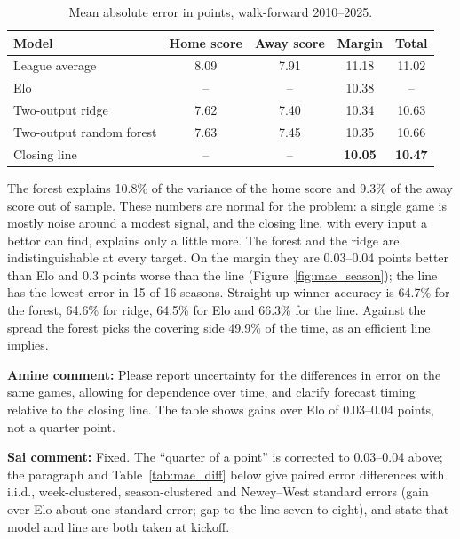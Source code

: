 \documentclass[11pt]{article}
\begin{document}
\begin{table}[H]
\centering
\small
\begin{tabular}{lcccc}
\toprule
\textbf{Model} & \textbf{Home score} & \textbf{Away score} & \textbf{Margin} & \textbf{Total} \\
\midrule
League average & 8.09 & 7.91 & 11.18 & 11.02 \\
Elo & -- & -- & 10.38 & -- \\
Two-output ridge & 7.62 & 7.40 & 10.34 & 10.63 \\
Two-output random forest & 7.63 & 7.45 & 10.35 & 10.66 \\
Closing line & -- & -- & \textbf{10.05} & \textbf{10.47} \\
\bottomrule
\end{tabular}
\caption{Mean absolute error in points, walk-forward 2010--2025.}
\label{tab:mae}
\end{table}

The forest explains 10.8\% of the variance of the home score and 9.3\% of the away score out of sample. These numbers are normal for the problem: a single game is mostly noise around a modest signal, and the closing line, with every input a bettor can find, explains only a little more. The forest and the ridge are indistinguishable at every target. On the margin they are 0.03--0.04 points better than Elo and 0.3 points worse than the line (Figure~\ref{fig:mae_season}); the line has the lowest error in 15 of 16 seasons. Straight-up winner accuracy is 64.7\% for the forest, 64.6\% for ridge, 64.5\% for Elo and 66.3\% for the line. Against the spread the forest picks the covering side 49.9\% of the time, as an efficient line implies.

{\color{red}\textbf{Amine comment:} Please report uncertainty for the differences in error on the same games, allowing for dependence over time, and clarify forecast timing relative to the closing line. The table shows gains over Elo of 0.03--0.04 points, not a quarter point.}

{\color{blue}\textbf{Sai comment:} Fixed. The ``quarter of a point'' is corrected to 0.03--0.04 above; the paragraph and Table~\ref{tab:mae_diff} below give paired error differences with i.i.d., week-clustered, season-clustered and Newey--West standard errors (gain over Elo about one standard error; gap to the line seven to eight), and state that model and line are both taken at kickoff.}
\end{document}
